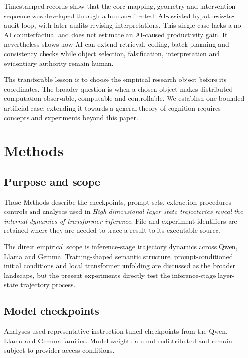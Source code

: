 \documentclass[11pt]{article}
\begin{document}
Timestamped records show that the core mapping, geometry and intervention sequence was developed through a human-directed, AI-assisted hypothesis-to-audit loop, with later audits revising interpretations. This single case lacks a no-AI counterfactual and does not estimate an AI-caused productivity gain. It nevertheless shows how AI can extend retrieval, coding, batch planning and consistency checks while object selection, falsification, interpretation and evidentiary authority remain human.

The transferable lesson is to choose the empirical research object before its coordinates. The broader question is when a chosen object makes distributed computation observable, computable and controllable. We establish one bounded artificial case; extending it towards a general theory of cognition requires concepts and experiments beyond this paper.
\section{Methods}
\subsection*{Purpose and scope}
These Methods describe the checkpoints, prompt sets, extraction procedures, controls and analyses used in \emph{High-dimensional layer-state trajectories reveal the internal dynamics of transformer inference}. File and experiment identifiers are retained where they are needed to trace a result to its executable source.

The direct empirical scope is inference-stage trajectory dynamics across Qwen, Llama and Gemma. Training-shaped semantic structure, prompt-conditioned initial conditions and local transformer unfolding are discussed as the broader landscape, but the present experiments directly test the inference-stage layer-state trajectory process.

\subsection*{Model checkpoints}
Analyses used representative instruction-tuned checkpoints from the Qwen, Llama and Gemma families. Model weights are not redistributed and remain subject to provider access conditions.
\end{document}
